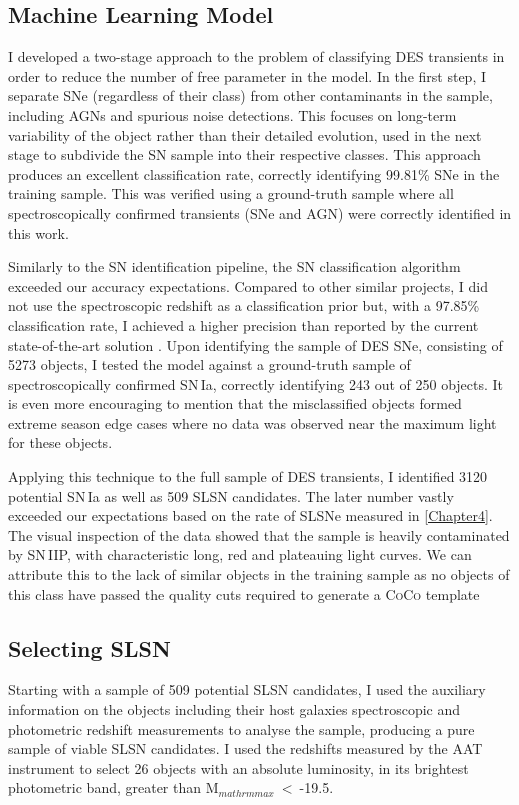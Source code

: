 \subsection{Machine Learning Model}
I developed a two-stage approach to the problem of classifying DES transients in order to reduce the number of free parameter in the model. In the first step, I separate SNe (regardless of their class) from other contaminants in the sample, including AGNs and spurious noise detections. This focuses on long-term variability of the object rather than their detailed evolution, used in the next stage to subdivide the SN sample
into their respective classes. This approach produces an excellent classification rate, correctly identifying 99.81\% SNe in the training sample. This was verified using a ground-truth sample where all spectroscopically confirmed transients (SNe and AGN) were correctly identified in this work.

Similarly to the SN identification pipeline, the SN classification algorithm exceeded our accuracy expectations. Compared to other similar projects, I did not use the spectroscopic redshift as a classification prior but, with a 97.85\% classification rate, I achieved a higher precision than reported by the current state-of-the-art solution \citep{Lochner2016}. Upon identifying the sample of DES SNe, consisting of 5273 objects, I tested the model against a ground-truth sample of spectroscopically confirmed SN\,Ia, correctly identifying 243 out of 250 objects. It is even more encouraging to mention that the misclassified objects formed extreme season edge cases where no data was observed near the maximum light for these objects.

Applying this technique to the full sample of DES transients, I identified 3120 potential SN\,Ia as well as 509 SLSN candidates. The later number vastly exceeded our expectations based on the rate of SLSNe measured in \cref{Chapter4}. The visual inspection of the data showed that the sample is heavily contaminated by SN\,IIP, with characteristic long, red and plateauing light curves. We can attribute this to the lack of similar objects in the training sample as no objects of this class have passed the quality cuts required to generate a \textsc{CoCo} template

\subsection{Selecting SLSN}
Starting with a sample of 509 potential SLSN candidates, I used the auxiliary information on the objects including their host galaxies spectroscopic and photometric redshift measurements to analyse the sample, producing a pure sample of viable SLSN candidates. I used the redshifts measured by the AAT instrument to select 26 objects with an absolute luminosity, in its brightest photometric band, greater than M$_{mathrm{max}}~<~$-19.5.

